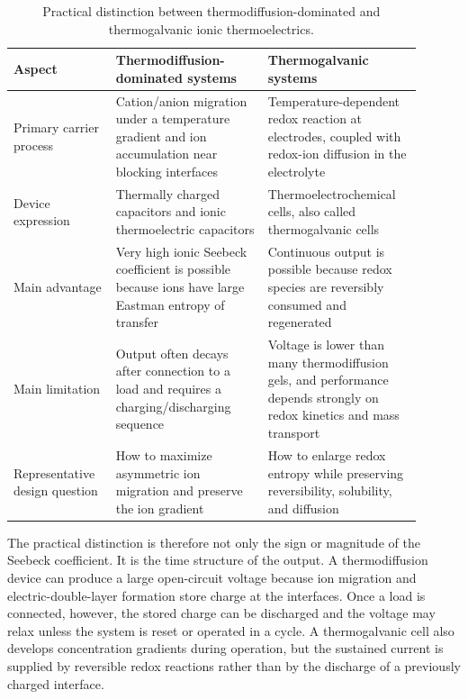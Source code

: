 \begin{table}[H]
\centering
\caption{Practical distinction between thermodiffusion-dominated and
thermogalvanic ionic thermoelectrics.}
\footnotesize
\begin{tabular}{>{\raggedright\arraybackslash}p{0.22\linewidth}
>{\raggedright\arraybackslash}p{0.34\linewidth}
>{\raggedright\arraybackslash}p{0.34\linewidth}}
\toprule
Aspect & Thermodiffusion-dominated systems & Thermogalvanic systems \\
\midrule
Primary carrier process & Cation/anion migration under a temperature gradient
and ion accumulation near blocking interfaces & Temperature-dependent redox
reaction at electrodes, coupled with redox-ion diffusion in the electrolyte \\
Device expression & Thermally charged capacitors and ionic thermoelectric
capacitors & Thermoelectrochemical cells, also called thermogalvanic cells \\
Main advantage & Very high ionic Seebeck coefficient is possible because ions
have large Eastman entropy of transfer & Continuous output is possible because
redox species are reversibly consumed and regenerated \\
Main limitation & Output often decays after connection to a load and requires a
charging/discharging sequence & Voltage is lower than many thermodiffusion
gels, and performance depends strongly on redox kinetics and mass transport \\
Representative design question & How to maximize asymmetric ion migration and
preserve the ion gradient & How to enlarge redox entropy while preserving
reversibility, solubility, and diffusion \\
\bottomrule
\end{tabular}
\end{table}

The practical distinction is therefore not only the sign or magnitude of the
Seebeck coefficient. It is the time structure of the output. A thermodiffusion
device can produce a large open-circuit voltage because ion migration and
electric-double-layer formation store charge at the interfaces. Once a load is
connected, however, the stored charge can be discharged and the voltage may
relax unless the system is reset or operated in a cycle. A thermogalvanic cell
also develops concentration gradients during operation, but the sustained current
is supplied by reversible redox reactions rather than by the discharge of a previously
charged interface.

